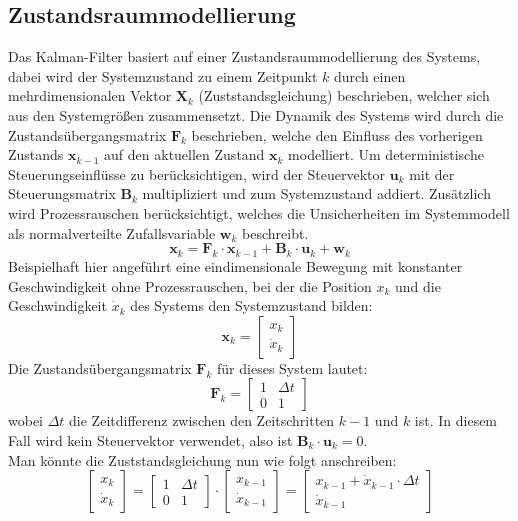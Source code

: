 \subsection{Zustandsraummodellierung}
\label{subsec:zustandsraummodellierung}
Das Kalman-Filter basiert auf einer Zustandsraummodellierung des Systems, dabei wird der Systemzustand zu einem Zeitpunkt $k$ durch einen mehrdimensionalen Vektor $\mathbf{X}_k$ (Zuststandsgleichung) beschrieben, welcher sich aus den Systemgrößen zusammensetzt. Die Dynamik des Systems wird durch die Zustandsübergangsmatrix $\mathbf{F}_k$ beschrieben, welche den Einfluss des vorherigen Zustands $\mathbf{x}_{k-1}$ auf den aktuellen Zustand $\mathbf{x}_k$ modelliert. Um deterministische Steuerungseinflüsse zu berücksichtigen, wird der Steuervektor $\mathbf{u}_k$ mit der Steuerungsmatrix $\mathbf{B}_k$ multipliziert und zum Systemzustand addiert. Zusätzlich wird Prozessrauschen  berücksichtigt, welches die Unsicherheiten im Systemmodell als normalverteilte Zufallsvariable $\mathbf{w}_k$ beschreibt.
\begin{equation}
    \mathbf{x}_k = \mathbf{F}_k \cdot \mathbf{x}_{k-1} + \mathbf{B}_k \cdot \mathbf{u}_k + \mathbf{w}_k
\end{equation}
Beispielhaft hier angeführt eine eindimensionale Bewegung mit konstanter Geschwindigkeit ohne Prozessrauschen, bei der die Position $x_k$ und die Geschwindigkeit $\dot{x}_k$ des Systems den Systemzustand bilden:
\begin{equation}
    \mathbf{x}_k = \begin{bmatrix}
    x_k \\
    \dot{x}_k
    \end{bmatrix}
\end{equation}
Die Zustandsübergangsmatrix $\mathbf{F}_k$ für dieses System lautet:
\begin{equation}
    \mathbf{F}_k = \begin{bmatrix}
    1 & \Delta t \\
    0 & 1
    \end{bmatrix}
\end{equation}
wobei $\Delta t$ die Zeitdifferenz zwischen den Zeitschritten $k-1$ und $k$ ist. In diesem Fall wird kein Steuervektor verwendet, also ist $\mathbf{B}_k \cdot \mathbf{u}_k = 0$.
\\
Man könnte die Zuststandsgleichung nun wie folgt anschreiben:
\begin{equation}
    \begin{bmatrix}
    x_k \\
    \dot{x}_k
    \end{bmatrix} = \begin{bmatrix}
    1 & \Delta t \\
    0 & 1
    \end{bmatrix} \cdot \begin{bmatrix}
    x_{k-1} \\
    \dot{x}_{k-1}
    \end{bmatrix}
     = \begin{bmatrix}
    x_{k-1} + \dot{x}_{k-1} \cdot \Delta t \\
    \dot{x}_{k-1}
    \end{bmatrix}
\end{equation}
